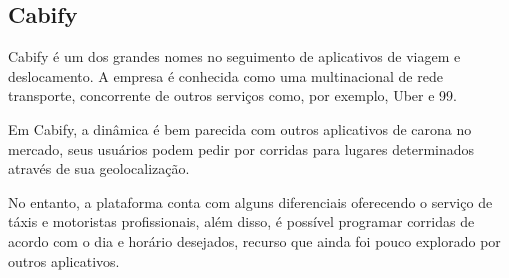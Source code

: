 \subsection{Cabify}

Cabify é um dos grandes nomes no seguimento de aplicativos de viagem e deslocamento. A empresa é conhecida como uma multinacional de rede transporte, concorrente de outros serviços como, por exemplo, Uber e 99.

Em Cabify, a dinâmica é bem parecida com outros aplicativos de carona no mercado, seus usuários podem pedir por corridas para lugares determinados através de sua geolocalização.

No entanto, a plataforma conta com alguns diferenciais oferecendo o serviço de táxis e motoristas profissionais, além disso, é possível programar corridas de acordo com o dia e horário desejados, recurso que ainda foi pouco explorado por outros aplicativos. 

